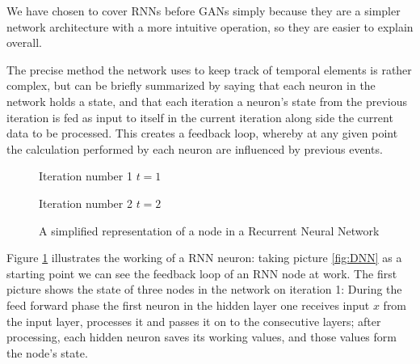We have chosen to cover RNNs before GANs simply because they are a simpler network architecture with a more intuitive operation, so they are easier to explain overall.

The precise method the network uses to keep track of temporal elements is rather complex, but can be briefly summarized by saying that each neuron in the network holds a state, and that each iteration a neuron's state from the previous iteration is fed as input to itself in the current iteration along side the current data to be processed.
This creates a feedback loop, whereby at any given point the calculation performed by each neuron are influenced by previous events.

\begin{figure}[H]    
\centering
{}
\begin{center}
Iteration number 1 $t=1$
\end{center}
\end{figure}

\begin{figure}[H]
\centering    
{}
\begin{center}
Iteration number 2 $t=2$
\end{center}
    \caption{A simplified representation of a node in a Recurrent Neural Network}\label{fig:rnn_neuron}
    
\end{figure}
Figure \ref{fig:rnn_neuron} illustrates the working of a RNN neuron: taking picture \ref{fig:DNN} as a starting point we can see the feedback loop of an RNN node at work.
The first picture shows the state of three nodes in the network on iteration 1: During the feed forward phase the first neuron in the hidden layer one receives input $x$ from the input layer, processes it and passes it on to the consecutive layers; after processing, each hidden neuron saves its working values, and those values form the node's state.  

